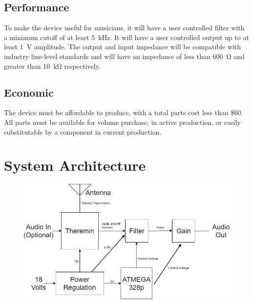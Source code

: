 \documentclass[a4paper,12pt]{article}
\begin{document}
	\subsection*{Performance}
		To make the device useful for musicians, it will have a user controlled filter with a minimum cutoff of at least \SI{5}{\kilo\hertz}. It will have a user controlled output up to at least \SI{1}{\volt} amplitude. The output and input impedance will be compatible with industry line-level standards and will have an impedance of less than \SI{600}{\ohm} and greater than \SI{10}{\kilo\ohm} respectively. 
	\subsection*{Economic}
	The device must be affordable to produce, with a total parts cost less than \$60. All parts must be available for volume purchase, in active production, or easily substitutable by a component in current production. 
\section*{System Architecture}
	\begin{figure}[H]
\includegraphics[width = \textwidth]{Theremizer_HighLevel_BD.png}
	\end{figure}
\end{document}
